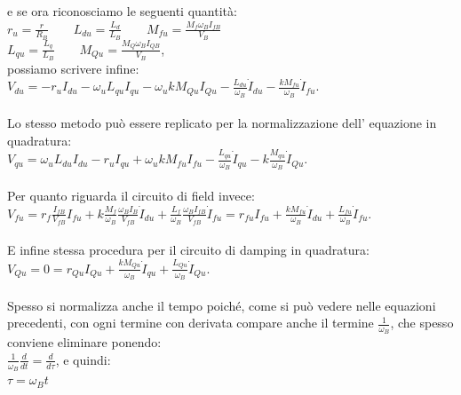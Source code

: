 \documentclass[Lau,noexaminfo]{sapthesis}
\begin{document}
	 e se ora riconosciamo le seguenti quantità:\\
	 $r_u=\frac{r}{R_B} \qquad L_{du}=\frac{L_d}{L_B} \qquad M_{fu}=\frac{M_f\omega_B I_{fB}}{V_B}$\\
	 $L_{qu}=\frac{L_q}{L_B} \qquad M_{Qu}=\frac{M_Q \omega_B I_{QB}}{V_B} $,\\
	 possiamo scrivere infine:\\
	 $V_{du}=-r_uI_{du}-\omega_u L_{qu} I_{qu} -\omega_ukM_{Qu} I_{Qu} -\frac{L_{du}}{\omega_B}\dot{I}_{du}-\frac{kM_{fu}}{\omega_B}\dot{I}_{fu}$.\\\\
	 Lo stesso metodo può essere replicato per la normalizzazione dell' equazione in quadratura:\\
	 $V_{qu}=\omega_u L_{du}I_{du}-r_u I_{qu}+\omega_ukM_{fu}I_{fu}-\frac{L_{qu}}{\omega_B}\dot{I}_{qu}-k\frac{M_{qu}}{\omega_B}\dot{I}_{Qu}$.\\\\
	 Per quanto riguarda il circuito di field invece:\\
	 $V_{fu}=r_f\frac{I_{fB}}{V_{fB}}I_{fu}+k\frac{M_f}{\omega_B}\frac{\omega_BI_B}{V_{fB}}\dot{I}_{du}+\frac{L_f}{\omega_B}\frac{\omega_BI_{fB}}{V_{fB}}\dot{I}_{fu}=r_{fu}I_{fu}+\frac{kM_{fu}}{\omega_B}\dot{I}_{du}+\frac{L_{fu}}{\omega_B}\dot{I}_{fu}$.\\\\
	 E infine stessa procedura per il circuito di damping in quadratura:\\
	 $V_{Qu}=0=r_{Qu}I_{Qu}+\frac{kM_{Qu}}{\omega_B}\dot{I}_{qu}+\frac{L_{Qu}}{\omega_B}\dot{I}_{Qu}$.\\\\
	 Spesso si normalizza anche il tempo poiché, come si può vedere nelle equazioni precedenti, con ogni termine con derivata compare anche il termine $\frac{1}{\omega_B}$, che spesso conviene eliminare ponendo:\\
	 $\frac{1}{\omega_B}\frac{d}{dt}=\frac{d}{d\tau}$, e quindi:\\
	 $\tau=\omega_Bt$
\end{document}
